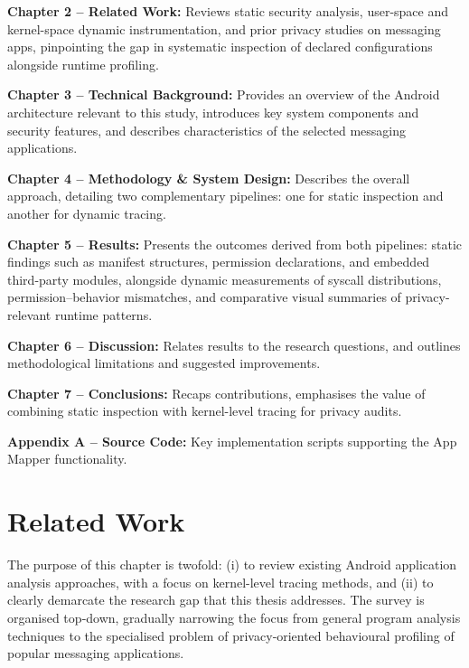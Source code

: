 \documentclass[a4paper,12pt]{report}
\begin{document}
\vspace{0.4em}
\textbf{Chapter 2 – Related Work:} Reviews static security analysis, user-space and kernel-space dynamic instrumentation, and prior privacy studies on messaging apps, pinpointing the gap in systematic inspection of declared configurations alongside runtime profiling.

\vspace{0.4em}
\textbf{Chapter 3 – Technical Background:} Provides an overview of the Android architecture relevant to this study, introduces key system components and security features, and describes characteristics of the selected messaging applications.

\vspace{0.4em}
\textbf{Chapter 4 – Methodology \& System Design:} Describes the overall approach, detailing two complementary pipelines: one for static inspection and another for dynamic tracing.

\vspace{0.4em}
\textbf{Chapter 5 – Results:} Presents the outcomes derived from both pipelines: static findings such as manifest structures, permission declarations, and embedded third-party modules, alongside dynamic measurements of syscall distributions, permission–behavior mismatches, and comparative visual summaries of privacy-relevant runtime patterns.

\vspace{0.4em}
\textbf{Chapter 6 – Discussion:} Relates results to the research questions, and outlines methodological limitations and suggested improvements.

\vspace{0.4em}
\textbf{Chapter 7 – Conclusions:} Recaps contributions, emphasises the value of combining static inspection with kernel-level tracing for privacy audits.

\vspace{0.4em}
\textbf{Appendix A – Source Code:} Key implementation scripts supporting the App Mapper functionality.


\chapter{Related Work}\label{ch:related}

The purpose of this chapter is twofold: (i) to review existing Android application analysis approaches, with a focus on kernel-level tracing methods, and (ii) to
clearly demarcate the research gap that this thesis addresses.  The survey is
organised top‑down, gradually narrowing the focus from general program analysis
techniques to the specialised problem of privacy‑oriented behavioural
profiling of popular messaging applications.
\end{document}
